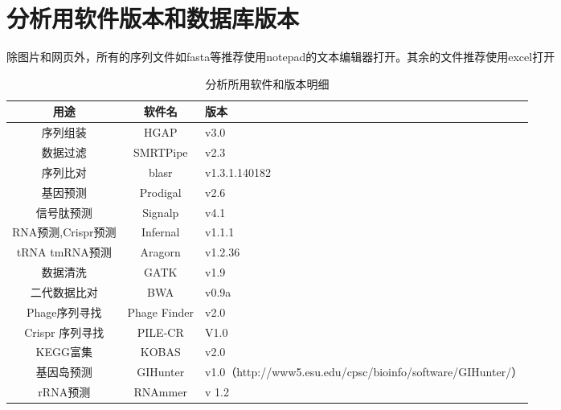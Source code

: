 \section{分析用软件版本和数据库版本}
除图片和网页外，所有的序列文件如fasta等推荐使用notepad的文本编辑器打开。其余的文件推荐使用excel打开
\begin{table}[H]
        \begin{center}
          
        
        \caption{分析所用软件和版本明细}
            \begin{threeparttable}
                \begin{tabularx}{\textwidth}{ccX}

                    \toprule
                    \bfseries{用途}                  &\bfseries{软件名} &\bfseries{版本}\\
                    \midrule
                    		
                    序列组装&HGAP	&v3.0\\
                    数据过滤&SMRTPipe	&v2.3\\
                    序列比对	&blasr	&v1.3.1.140182\\
                    基因预测	&Prodigal	&v2.6\\
                    信号肽预测	&Signalp	&v4.1\\
                    RNA预测,Crispr预测	&Infernal	&v1.1.1\\
                    tRNA tmRNA预测	&Aragorn	&v1.2.36\\
                    数据清洗	&GATK	&v1.9\\
                    二代数据比对	&BWA	&v0.9a\\
                    Phage序列寻找	&Phage Finder	&v2.0\\
                    Crispr 序列寻找&	PILE-CR	&V1.0\\
                    KEGG富集&	KOBAS&	v2.0\\
                    基因岛预测&	GIHunter	&v1.0（http://www5.esu.edu/cpsc/bioinfo/software/GIHunter/）\\

                    rRNA预测&RNAmmer&	v 1.2\\
                    \bottomrule

                \end{tabularx}

            \end{threeparttable}
        \end{center}
\end{table}

